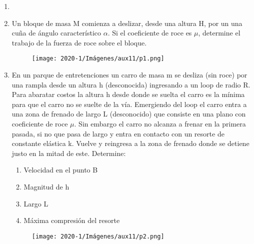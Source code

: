 \documentclass[letterpaper,11pt]{article}
\begin{document}
\vspace{-1cm}
\begin{enumerate}\setlength{\itemsep}{0.4cm}


\item[]

\item Un bloque de masa M comienza a deslizar, desde una altura H, por un una cuña de ángulo característico $\alpha$. Si el coeficiente de roce es $\mu$, determine el trabajo de la fuerza de roce sobre el bloque. 
\begin{figure}[h!]
    \centering
    \texttt{[image: 2020-1/Imágenes/aux11/p1.png]}
\end{figure}

\item En un parque de entretenciones un carro de masa m se desliza (sin roce) por una rampla desde un altura h (desconocida) ingresando a un loop de radio R. Para abaratar costos la altura h desde donde se suelta el carro es la mínima para que el carro no se suelte de la vía. Emergiendo del loop el carro entra a una zona de frenado de largo L (desconocido) que consiste en una plano con coeficiente de roce $\mu$. Sin embargo el carro no alcanza a frenar en la primera pasada, si no que pasa de largo y entra en contacto con un resorte de constante elástica k. Vuelve y reingresa a la zona de frenado donde se detiene justo en la mitad de este. Determine:
\begin{enumerate}
    \item Velocidad en el punto B
    \item Magnitud de h
    \item Largo L
    \item Máxima compresión del resorte
\end{enumerate}
\begin{figure}[h!]
    \centering
    \texttt{[image: 2020-1/Imágenes/aux11/p2.png]}
\end{figure}


\end{enumerate}
\end{document}
